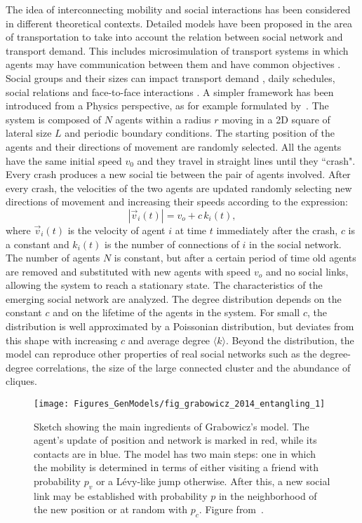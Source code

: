 The idea of interconnecting mobility and social interactions has been considered in different theoretical contexts. Detailed models have been proposed in the area of transportation to take into account the relation between social network and transport demand. This includes microsimulation of transport systems \cite{axhausen_2005_social,carrasco_2006_exploring,dugunji_2005_discrete} in which agents may have communication between them and have common objectives \cite{paez_2007_social}. Social groups and their sizes can impact transport demand  \cite{molin_2007_social}, daily schedules, social relations and face-to-face interactions \cite{arentze_2008_social,carrasco_2009_social,hackney_2011_coupled,ronald_2012_modeling,sharmeen_2014_dynamics}. A simpler framework has been introduced from a Physics perspective, as for example formulated by~\cite{gonzalez_2006_system}. The system is composed of $N$ agents within a radius $r$ moving in a 2D square of lateral size $L$ and periodic boundary conditions. The starting position of the agents and their directions of movement are randomly selected. All the agents have the same initial speed $v_0$ and they travel in straight lines until they ``crash". Every crash produces a new social tie between the pair of agents involved. After every crash, the velocities of the two agents are updated randomly selecting new directions of movement and increasing their speeds according to the expression:
\begin{equation}
|\vec{v}_i (t)| = v_o + c\, k_i(t), 
\end{equation}
where $\vec{v}_i (t)$ is the velocity of agent $i$ at time $t$ immediately after the crash, $c$ is a constant and $k_i(t)$ is the number of connections of $i$ in the social network. The number of agents $N$ is constant, but after a certain period of time old agents are removed and substituted with new agents with speed $v_o$ and no social links, allowing the system to reach a stationary state. The characteristics of the emerging social network are analyzed. The degree distribution depends on the constant $c$ and on the lifetime of the agents in the system. For small $c$, the distribution is well approximated by a Poissonian distribution, but deviates from this shape with increasing $c$ and average degree $\langle k \rangle$. Beyond the distribution, the model can reproduce other properties of real social networks such as the degree-degree correlations, the size of the large connected cluster and the abundance of cliques.

\begin{figure}[t!]
\centering
\texttt{[image: Figures\_GenModels/fig\_grabowicz\_2014\_entangling\_1]}
\caption{Sketch showing the main ingredients of Grabowicz's model. The agent's update of position and network is marked in red, while its contacts are in blue. The model has two main steps: one in which the mobility is determined in terms of either visiting a friend with probability $p_v$ or a L\'evy-like jump otherwise. After this, a new social link may be established with  probability $p$ in the neighborhood of the new position or at random with $p_c$. Figure from~\cite{grabowicz_2014_entangling}.}
\label{fig:grabowicz_2014_entangling}
\end{figure}


